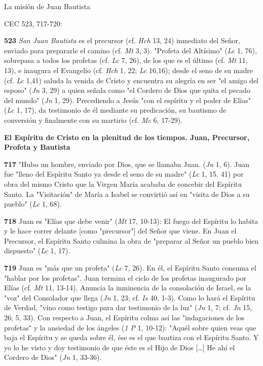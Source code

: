 \documentclass[]{article}
\begin{document}
La misión de Juan Bautista

CEC 523, 717-720:

\textbf{523} \emph{San Juan Bautista} es el precursor (cf. \emph{Hch}
13, 24) inmediato del Señor, enviado para prepararle el camino (cf.
\emph{Mt} 3, 3). "Profeta del Altísimo" (\emph{Lc} 1, 76), sobrepasa a
todos los profetas (cf. \emph{Lc} 7, 26), de los que es el último (cf.
\emph{Mt} 11, 13), e inaugura el Evangelio (cf. \emph{Hch} 1, 22;
\emph{Lc} 16,16); desde el seno de su madre (cf. \emph{Lc} 1,41) saluda
la venida de Cristo y encuentra su alegría en ser "el amigo del esposo"
(\emph{Jn} 3, 29) a quien señala como "el Cordero de Dios que quita el
pecado del mundo" (\emph{Jn} 1, 29). Precediendo a Jesús "con el
espíritu y el poder de Elías" (\emph{Lc} 1, 17), da testimonio de él
mediante su predicación, su bautismo de conversión y finalmente con su
martirio (cf. \emph{Mc} 6, 17-29).

\textbf{El Espíritu de Cristo en la plenitud de los tiempos. Juan,
Precursor, Profeta y Bautista}

\textbf{717} "Hubo un hombre, enviado por Dios, que se llamaba Juan.
(\emph{Jn} 1, 6). Juan fue "lleno del Espíritu Santo ya desde el seno de
su madre" (\emph{Lc} 1, 15. 41) por obra del mismo Cristo que la Virgen
María acababa de concebir del Espíritu Santo. La "Visitación" de María a
Isabel se convirtió así en "visita de Dios a su pueblo" (\emph{Lc} 1,
68).

\textbf{718} Juan es "Elías que debe venir" (\emph{Mt} 17, 10-13): El
fuego del Espíritu lo habita y le hace correr delante {[}como
"precursor"{]} del Señor que viene. En Juan el Precursor, el Espíritu
Santo culmina la obra de "preparar al Señor un pueblo bien dispuesto"
(\emph{Lc} 1, 17).

\textbf{719} Juan es "más que un profeta" (\emph{Lc} 7, 26). En él, el
Espíritu Santo consuma el "hablar por los profetas". Juan termina el
ciclo de los profetas inaugurado por Elías (cf. \emph{Mt} 11, 13-14).
Anuncia la inminencia de la consolación de Israel, es la "voz" del
Consolador que llega (\emph{Jn} 1, 23; cf. \emph{Is} 40, 1-3). Como lo
hará el Espíritu de Verdad, "vino como testigo para dar testimonio de la
luz" (\emph{Jn} 1, 7; cf. \emph{Jn} 15, 26; 5, 33). Con respecto a Juan,
el Espíritu colma así las "indagaciones de los profetas" y la ansiedad
de los ángeles (\emph{1 P} 1, 10-12): "Aquél sobre quien veas que baja
el Espíritu y se queda sobre él, ése es el que bautiza con el Espíritu
Santo. Y yo lo he visto y doy testimonio de que éste es el Hijo de Dios
[\ldots{}] He ahí el Cordero de Dios" (\emph{Jn} 1, 33-36).
\end{document}
